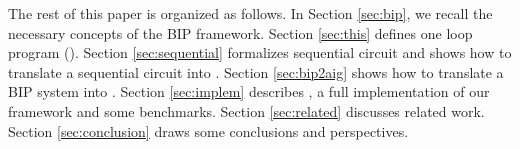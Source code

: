 The rest of this paper is organized as follows. In Section \ref{sec:bip}, we recall the necessary concepts of the BIP framework. Section \ref{sec:this} defines one loop program (\caig). Section \ref{sec:sequential} formalizes sequential circuit and shows how to translate a sequential circuit into \caig. Section \ref{sec:bip2aig} shows how to translate a BIP system into \caig. Section \ref{sec:implem}
describes \biptool{}, a full implementation of our framework and some benchmarks. Section \ref{sec:related} discusses related work. Section \ref{sec:conclusion} draws some conclusions and perspectives.
